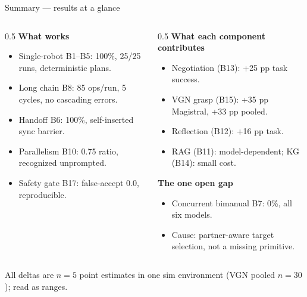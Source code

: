 \documentclass[aspectratio=169,11pt]{beamer}
\begin{document}
\begin{frame}{Summary --- results at a glance}
	\begin{columns}[T]
		\begin{column}{0.5\textwidth}
			\footnotesize
			\textbf{What works}
			\begin{itemize}\footnotesize
				\item Single-robot B1--B5: \alert{100\%}, 25/25 runs, deterministic plans.
				\item Long chain B8: 85 ops/run, 5 cycles, no cascading errors.
				\item Handoff B6: \alert{100\%}, self-inserted sync barrier.
				\item Parallelism B10: 0.75 ratio, recognized unprompted.
				\item Safety gate B17: false-accept \alert{0.0}, reproducible.
			\end{itemize}
		\end{column}
		\begin{column}{0.5\textwidth}
			\footnotesize
			\textbf{What each component contributes}
			\begin{itemize}\footnotesize
				\item Negotiation (B13): \alert{+25 pp} task success.
				\item VGN grasp (B15): \alert{+35 pp} Magistral, +33 pp pooled.
				\item Reflection (B12): +16 pp task.
				\item RAG (B11): model-dependent; KG (B14): small cost.
			\end{itemize}
			\vspace{0.5em}
			\textbf{The one open gap}
			\begin{itemize}\footnotesize
				\item Concurrent bimanual B7: \alert{0\%}, all six models.
				\item Cause: \alert{partner-aware target selection}, not a missing primitive.
			\end{itemize}
		\end{column}
	\end{columns}
	\vfill
	\footnotesize All deltas are $n=5$ point estimates in one sim environment (VGN pooled $n=30$); read as ranges.
\end{frame}
\end{document}
